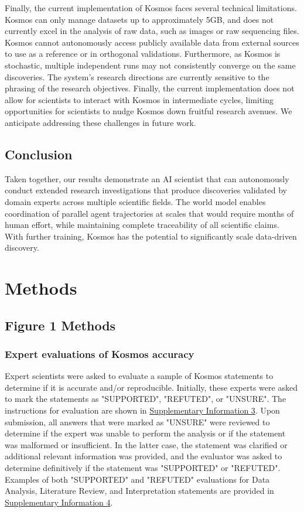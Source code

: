 \documentclass{article}
\begin{document}
Finally, the current implementation of Kosmos faces several technical limitations. Kosmos can only manage datasets up to approximately 5GB, and does not currently excel in the analysis of raw data, such as images or raw sequencing files. Kosmos cannot autonomously access publicly available data from external sources to use as a reference or in orthogonal validations.   Furthermore, as Kosmos is stochastic, multiple independent runs may not consistently converge on the same discoveries. The system's research directions are currently sensitive to the phrasing of the research objectives. Finally, the current implementation does not allow for scientists to interact with Kosmos in intermediate cycles, limiting opportunities for scientists to nudge Kosmos down fruitful research avenues. We anticipate addressing these challenges in future work. 

\subsection{Conclusion}

Taken together, our results demonstrate an AI scientist that can autonomously conduct extended research investigations that produce discoveries validated by domain experts across multiple scientific fields. The world model enables coordination of parallel agent trajectories at scales that would require months of human effort, while maintaining complete traceability of all scientific claims. With further training, Kosmos has the potential to significantly scale data-driven discovery.


\section{Methods}
\label{sec:methods}

\subsection{Figure 1 Methods}

\subsubsection{Expert evaluations of Kosmos accuracy}

Expert scientists were asked to evaluate a sample of Kosmos statements to determine if it is accurate and/or reproducible. Initially, these experts were asked to mark the statements as "SUPPORTED", "REFUTED", or "UNSURE". The instructions for evaluation are shown in \hyperref[sec:supp_eval_overview]{Supplementary Information 3}. Upon submission, all answers that were marked as "UNSURE" were reviewed to determine if the expert was unable to perform the analysis or if the statement was malformed or insufficient. In the latter case, the statement was clarified or additional relevant information was provided, and the evaluator was asked to determine definitively if the statement was "SUPPORTED" or "REFUTED". Examples of both "SUPPORTED" and "REFUTED" evaluations for Data Analysis, Literature Review, and Interpretation statements are provided in \hyperref[sec:supp_eval_answers]{Supplementary Information 4}.
\end{document}
